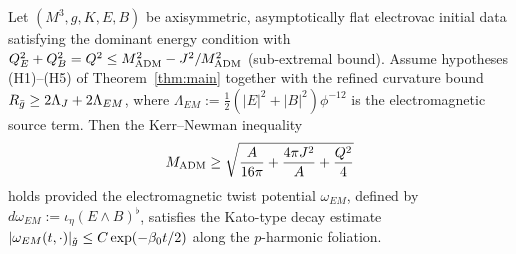 \begin{theorem}\label{thm:partial-KN-via-TBM}
Let $(M^3, g, K, E, B)$ be axisymmetric, asymptotically flat electrovac initial data satisfying the dominant energy condition with $Q_E^2 + Q_B^2 = Q^2 \leq M_{\mathrm{ADM}}^2 - J^2/M_{\mathrm{ADM}}^2$ (sub-extremal bound). Assume hypotheses (H1)--(H5) of Theorem~\ref{thm:main} together with the refined curvature bound $R_{\bar{g}} \geq 2\Lambda_J + 2\Lambda_{EM}$, where $\Lambda_{EM} := \tfrac{1}{2}(|E|^2 + |B|^2)\phi^{-12}$ is the electromagnetic source term. Then the Kerr--Newman inequality
\begin{equation}\label{eq:partial-KN-TBM}
M_{\mathrm{ADM}} \geq \sqrt{\frac{A}{16\pi} + \frac{4\pi J^2}{A} + \frac{Q^2}{4}}
\end{equation}
holds provided the electromagnetic twist potential $\omega_{EM}$, defined by $d\omega_{EM} := \iota_\eta (E \wedge B)^\flat$, satisfies the Kato-type decay estimate $|\omega_{EM}(t, \cdot)|_{\tilde{g}} \leq C \exp(-\beta_0 t/2)$ along the $p$-harmonic foliation.
\end{theorem}

